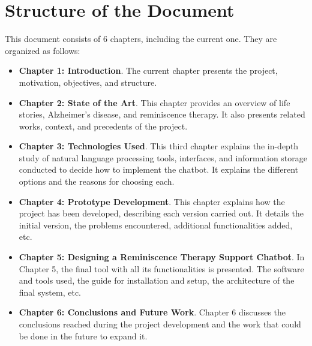 \section{Structure of the Document}
This document consists of 6 chapters, including the current one. They are organized as follows:
\begin{itemize}
	\item \textbf{Chapter 1: Introduction}. The current chapter presents the project, motivation, objectives, and structure.
	\item \textbf{Chapter 2: State of the Art}. This chapter provides an overview of life stories, Alzheimer's disease, and reminiscence therapy. It also presents related works, context, and precedents of the project.
	\item \textbf{Chapter 3: Technologies Used}. This third chapter explains the in-depth study of natural language processing tools, interfaces, and information storage conducted to decide how to implement the chatbot. It explains the different options and the reasons for choosing each.
	\item \textbf{Chapter 4: Prototype Development}. This chapter explains how the project has been developed, describing each version carried out. It details the initial version, the problems encountered, additional functionalities added, etc.
	\item \textbf{Chapter 5: Designing a Reminiscence Therapy Support Chatbot}. In Chapter 5, the final tool with all its functionalities is presented. The software and tools used, the guide for installation and setup, the architecture of the final system, etc.
	\item \textbf{Chapter 6: Conclusions and Future Work}. Chapter 6 discusses the conclusions reached during the project development and the work that could be done in the future to expand it.
\end{itemize}